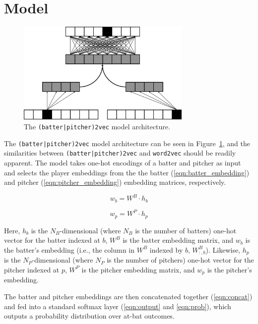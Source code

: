 \documentclass{article}
\begin{document}
\section{Model}
\label{model}

\begin{figure}[h]
\centering
\includegraphics[width=0.75\textwidth,height=\textheight,keepaspectratio]{batter_pitcher_model.png}
\caption{The \texttt{(batter|pitcher)2vec} model architecture.}
\label{fig:batter_pitcher}
\end{figure}

The \texttt{(batter|pitcher)2vec} model architecture can be seen in Figure~\ref{fig:batter_pitcher}, and the similarities between \texttt{(batter|pitcher)2vec} and \texttt{word2vec} should be readily apparent. The model takes one-hot encodings of a batter and pitcher as input and selects the player embeddings from the the batter (\ref{eqn:batter_embedding}) and pitcher (\ref{eqn:pitcher_embedding}) embedding matrices, respectively.

\begin{equation}
\label{eqn:batter_embedding}
w_b = W^B \cdot h_b
\end{equation}

\begin{equation}
\label{eqn:pitcher_embedding}
w_p = W^P \cdot h_p
\end{equation}

Here, $h_b$ is the $N_B$-dimensional (where $N_B$ is the number of batters) one-hot vector for the batter indexed at $b$, $W^B$ is the batter embedding matrix, and $w_b$ is the batter's embedding (i.e., the column in $W^{B}$ indexed by $b$, $W^{B}_{:,b}$). Likewise, $h_p$ is the $N_P$-dimensional (where $N_P$ is the number of pitchers) one-hot vector for the pitcher indexed at $p$, $W^P$ is the pitcher embedding matrix, and $w_p$ is the pitcher's embedding.

The batter and pitcher embeddings are then concatenated together (\ref{eqn:concat}) and fed into a standard softmax layer (\ref{eqn:output} and \ref{eqn:prob}), which outputs a probability distribution over at-bat outcomes.
\end{document}
